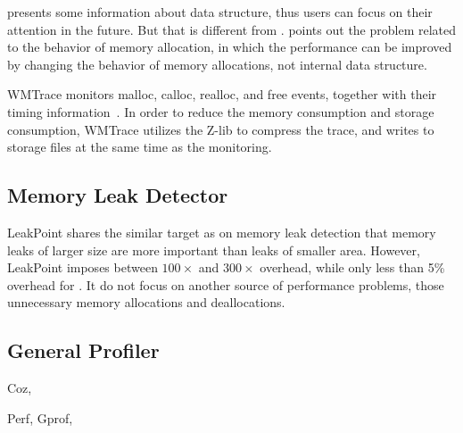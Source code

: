 \MP{} presents some information about data structure, thus users can focus on their attention in the future. But that is different from \MP{}. \MP{} points out the problem related to the behavior of memory allocation, in which the performance can be improved by changing the behavior of memory allocations, not internal data structure. 
  


\cite{846583}

\cite{1190248}


WMTrace monitors malloc, calloc, realloc, and free events, together with their timing information~\cite{Perks:2011:WAP:2186355.2186369}. In order to reduce the memory consumption and storage consumption, WMTrace utilizes the Z-lib to compress the trace, and writes to storage files at the same time as the monitoring. 
 

\subsection{Memory Leak Detector}

LeakPoint\cite{Clause:2010:LPC:1806799.1806874} shares the similar target as \MP{} on memory leak detection that memory leaks of larger size
are more important than leaks of smaller area. However, LeakPoint imposes between $100\times$ and $300\times$ overhead, while only less than 5\% overhead for \MP{}. It do not focus on another source of performance problems, those unnecessary memory allocations and deallocations. 

\subsection{General Profiler}

Coz, 

Perf, 
Gprof,

